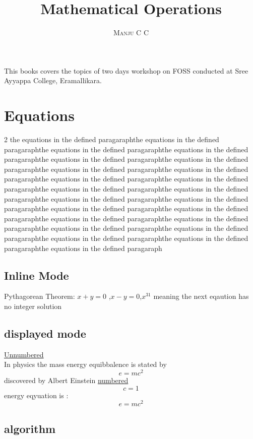 \documentclass[12pt]{book}
\begin{document}
\title {\textbf {Mathematical Operations}}
\author{\textsc{Manju C C}}
\date {}
\maketitle 
This books covers the topics of two days workshop on FOSS conducted at Sree Ayyappa College, Eramallikara.
\chapter{Equations}
\begin {multicols}{2}
the equations in the defined paragaraphthe equations in the defined paragaraphthe equations in the defined paragaraphthe equations in the defined paragaraphthe equations in the defined paragaraphthe equations in the defined paragaraphthe equations in the defined paragaraphthe equations in the defined paragaraphthe equations in the defined paragaraphthe equations in the defined paragaraphthe equations in the defined paragaraphthe equations in the defined paragaraphthe equations in the defined paragaraphthe equations in the defined paragaraphthe equations in the defined paragaraphthe equations in the defined paragaraphthe equations in the defined paragaraphthe equations in the defined paragaraphthe equations in the defined paragaraphthe equations in the defined paragaraphthe equations in the defined paragaraphthe equations in the defined paragaraphthe equations in the defined paragaraph

\section{Inline Mode}
Pythagorean Theorem: $ x+y=0 $ ,\(x-y=0\),$ x^{31} $ 
meaning the next eqaution has no integer solution
\section{displayed mode}
\underline{Unnumbered}\\
In physics the mass energy equibbalence is stated by  $$e=mc^2$$ discovered by Albert Einstein
\underline{numbered}\\
\begin{displaymath}
c=1
\end{displaymath}
energy eqyuation is :
\begin{equation}
e=mc^2
\end{equation}
\section{algorithm}
\begin{algorithm}[H]


\end{algorithm}
\end{multicols}
\end{document}
